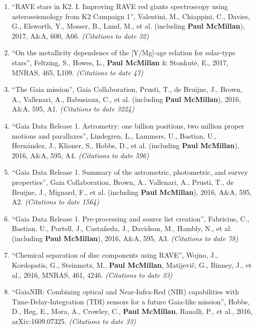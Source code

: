 \documentclass{resume}
\begin{document}
\begin{enumerate}
\item ``RAVE stars in K2. I. Improving RAVE red giants spectroscopy using asteroseismology from K2 Campaign 1'', Valentini, M., Chiappini, C., Davies, G., Elsworth, Y., Mosser, B., Lund, M., et al. (including \textbf{Paul McMillan}), 2017, A\&A, 600, A66. \textit{(Citations to date 32)}

\item ``On the metallicity dependence of the [Y/Mg]-age relation for solar-type stars'', Feltzing, S., Howes, L., \textbf{Paul McMillan} \& Stonkut\.{e}, E., 2017, MNRAS, 465, L109. \textit{(Citations to date 47)}

\item ``The Gaia mission'', Gaia Collaboration, Prusti, T., de Bruijne, J., Brown, A., Vallenari, A., Babusiaux, C., et al. (including \textbf{Paul McMillan}), 2016, A\&A, 595, A1. \textit{(Citations to date 3224)}

\item ``Gaia Data Release 1. Astrometry: one billion positions, two million proper motions and parallaxes'', Lindegren, L., Lammers, U., Bastian, U., Hern\'andez, J., Klioner, S., Hobbs, D., et al. (including \textbf{Paul McMillan}), 2016, A\&A, 595, A4. \textit{(Citations to date 596)}

\item ``Gaia Data Release 1. Summary of the astrometric, photometric, and survey properties'', Gaia Collaboration, Brown, A., Vallenari, A., Prusti, T., de Bruijne, J., Mignard, F., et al. (including \textbf{Paul McMillan}), 2016, A\&A, 595, A2. \textit{(Citations to date 1564)}

\item ``Gaia Data Release 1. Pre-processing and source list creation'', Fabricius, C., Bastian, U., Portell, J., Casta\~neda, J., Davidson, M., Hambly, N., et al. (including \textbf{Paul McMillan}), 2016, A\&A, 595, A3. \textit{(Citations to date 78)}

\item ``Chemical separation of disc components using RAVE'', Wojno, J., Kordopatis, G., Steinmetz, M., \textbf{Paul McMillan}, Matijevi\v{c}, G., Binney, J., et al., 2016, MNRAS, 461, 4246. \textit{(Citations to date 33)}

\item ``GaiaNIR: Combining optical and Near-Infra-Red (NIR) capabilities with Time-Delay-Integration (TDI) sensors for a future Gaia-like mission'', Hobbs, D., H{\o}g, E., Mora, A., Crowley, C., \textbf{Paul McMillan}, Ranalli, P., et al., 2016, arXiv:1609.07325. \textit{(Citations to date 33)}


\end{enumerate}
\end{document}
